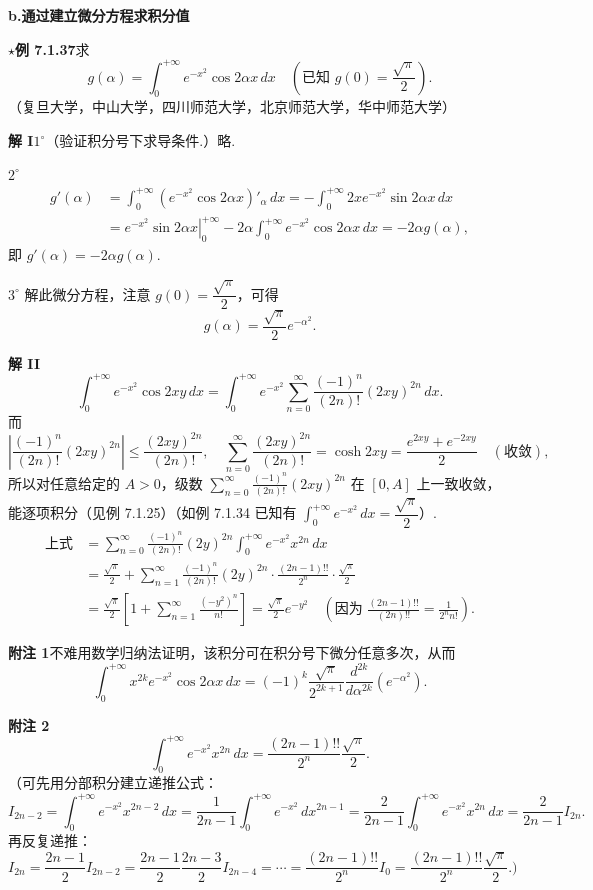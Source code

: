 \documentclass[UTF8, 12pt, fontset=fandol, oneside]{ctexart}
\begin{document}
\noindent\textbf{b.\quad 通过建立微分方程求积分值}

\noindent\textbf{$\star$例 7.1.37}\quad 求
\[
g(\alpha)=\int_0^{+\infty}e^{-x^2}\cos2\alpha x\,dx
\quad\left(\text{已知 }g(0)=\frac{\sqrt\pi}{2}\right).
\]
（复旦大学，中山大学，四川师范大学，北京师范大学，华中师范大学）

\noindent\textbf{解 I}\quad $1^\circ$（验证积分号下求导条件.）略.

$2^\circ$
\[
\begin{aligned}
g'(\alpha)
&=\int_0^{+\infty}(e^{-x^2}\cos2\alpha x)'_\alpha\,dx
=-\int_0^{+\infty}2xe^{-x^2}\sin2\alpha x\,dx\\
&=\left.e^{-x^2}\sin2\alpha x\right|_0^{+\infty}
-2\alpha\int_0^{+\infty}e^{-x^2}\cos2\alpha x\,dx
=-2\alpha g(\alpha),
\end{aligned}
\]
即 $g'(\alpha)=-2\alpha g(\alpha)$.

$3^\circ$ 解此微分方程，注意 $g(0)=\dfrac{\sqrt\pi}{2}$，可得
\[
g(\alpha)=\frac{\sqrt\pi}{2}e^{-\alpha^2}.
\]

\noindent\textbf{解 II}\quad
\[
\int_0^{+\infty}e^{-x^2}\cos2xy\,dx
=\int_0^{+\infty}e^{-x^2}\sum_{n=0}^{\infty}\frac{(-1)^n}{(2n)!}(2xy)^{2n}\,dx.
\]
而
\[
\left|\frac{(-1)^n}{(2n)!}(2xy)^{2n}\right|\le\frac{(2xy)^{2n}}{(2n)!},\quad
\sum_{n=0}^{\infty}\frac{(2xy)^{2n}}{(2n)!}=\cosh2xy=\frac{e^{2xy}+e^{-2xy}}2\quad(\text{收敛}),
\]
所以对任意给定的 $A>0$，级数 $\displaystyle\sum_{n=0}^{\infty}\frac{(-1)^n}{(2n)!}(2xy)^{2n}$ 在 $[0,A]$ 上一致收敛，能逐项积分（见例 7.1.25）（如例 7.1.34 已知有 $\displaystyle\int_0^{+\infty}e^{-x^2}\,dx=\dfrac{\sqrt\pi}{2}$）.
\[
\begin{aligned}
\text{上式}
&=\sum_{n=0}^{\infty}\frac{(-1)^n}{(2n)!}(2y)^{2n}
\int_0^{+\infty}e^{-x^2}x^{2n}\,dx\\
&=\frac{\sqrt\pi}{2}
+\sum_{n=1}^{\infty}\frac{(-1)^n}{(2n)!}(2y)^{2n}
\cdot\frac{(2n-1)!!}{2^n}\cdot\frac{\sqrt\pi}{2}\\
&=\frac{\sqrt\pi}{2}\left[1+\sum_{n=1}^{\infty}\frac{(-y^2)^n}{n!}\right]
=\frac{\sqrt\pi}{2}e^{-y^2}
\quad\left(\text{因为 }\frac{(2n-1)!!}{(2n)!!}=\frac1{2^n n!}\right).
\end{aligned}
\]

\noindent\textbf{附注 1}\quad 不难用数学归纳法证明，该积分可在积分号下微分任意多次，从而
\[
\int_0^{+\infty}x^{2k}e^{-x^2}\cos2\alpha x\,dx
=(-1)^k\frac{\sqrt\pi}{2^{2k+1}}\frac{d^{2k}}{d\alpha^{2k}}\left(e^{-\alpha^2}\right).
\]

\noindent\textbf{附注 2}\quad
\[
\int_0^{+\infty}e^{-x^2}x^{2n}\,dx
=\frac{(2n-1)!!}{2^n}\frac{\sqrt\pi}{2}.
\]
（可先用分部积分建立递推公式：
\[
I_{2n-2}=\int_0^{+\infty}e^{-x^2}x^{2n-2}\,dx
=\frac1{2n-1}\int_0^{+\infty}e^{-x^2}\,dx^{2n-1}
=\frac2{2n-1}\int_0^{+\infty}e^{-x^2}x^{2n}\,dx
=\frac2{2n-1}I_{2n}.
\]
再反复递推：
\[
I_{2n}=\frac{2n-1}{2}I_{2n-2}
=\frac{2n-1}{2}\frac{2n-3}{2}I_{2n-4}
=\cdots=\frac{(2n-1)!!}{2^n}I_0
=\frac{(2n-1)!!}{2^n}\frac{\sqrt\pi}{2}.)
\]
\end{document}

